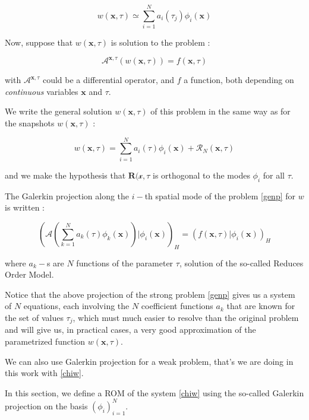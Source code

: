 \begin{equation}
w(\mathbf{x},\tau)\simeq\sum\limits_{i=1}^N a_i(\tau_j)\phi_i(\mathbf{x})
\end{equation}

Now, suppose that $w(\mathbf{x},\tau)$ is solution to the problem :

\begin{equation}\label{genp}
\mathcal{A}^{\mathbf{x},\tau}\left(w(\mathbf{x},\tau)\right)=f(\mathbf{x},\tau)
\end{equation}

with $\mathcal{A}^{\mathbf{x},\tau}$ could be a differential operator, %
and $f$ a function, both depending on \emph{continuous} variables $\mathbf{x}$ and $\tau$.

\par
We write the general solution $w(\mathbf{x},\tau)$ of this problem in the same way as for the snapshots $w(\mathbf{x},\tau)$ :

\[w(\mathbf{x},\tau)=\sum\limits_{i=1}^N a_i(\tau)\phi_i(\mathbf{x})+\mathcal{R}_N(\mathbf{x},\tau)\]

and we make the hypothesis that $\mathbf{R}(\mathcal{x},\tau$ is orthogonal to the modes $\phi_i$ for all $\tau$.

\par
The Galerkin projection along the $i-$th spatial mode of the problem \ref{genp} for $w$ is written :

\[%
\left(\mathcal{A}\left(\sum\limits_{k=1}^N a_k(\tau)\phi_k(\mathbf{x})\right) |\phi_i\left(\mathbf{x}\right)\right)_H %
= \left(f\left(\mathbf{x},\tau\right)|\phi_i(\mathbf{x})\right)_H%
\]

where $a_k-$s are $N$ functions of the parameter $\tau$, solution of the so-called Reduces Order Model.

\par
Notice that the above projection of the strong problem \ref{genp} gives us a system of $N$ equations, each involving the $N$ coefficient functions $a_k$ %
that are known for the set of values $\tau_j$, which must much easier to resolve than the original problem and will give us, %
in practical cases, a very good approximation of the parametrized function $w(\mathbf{x},\tau)$.

\par
We can also use Galerkin projection for a weak problem, that's we are doing in this work with \ref{chiw}.

\etoile
In this section, we define a ROM of the system \ref{chiw} using the so-called Galerkin projection on the basis $(\phi_i)_{i=1}^N$.

